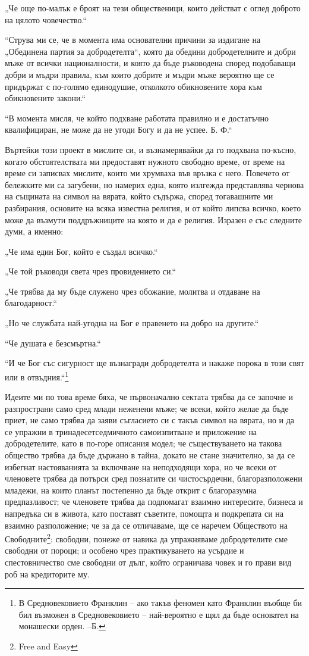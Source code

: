 \documentclass[12pt]{book}
\begin{document}
„Че още по-малък е броят на тези общественици, които действат с оглед доброто на цялото човечество.“

“Струва ми се, че в момента има основателни причини за издигане на „Обединена партия за добродетелта“, която да обедини добродетелните и добри мъже от всички националности, и която да бъде ръководена според подобаващи добри и мъдри правила, към които добрите и мъдри мъже вероятно ще се придържат с по-голямо единодушие, отколкото обикновените хора към обикновените закони.“

“В момента мисля, че който подхване работата правилно и е достатъчно квалифициран, не може да не угоди Богу и да не успее. 
Б. Ф.“

Въртейки този проект в мислите си, и възнамерявайки да го подхвана по-късно, когато обстоятелствата ми предоставят нужното свободно време, от време на време си записвах мислите, които ми хрумваха във връзка с него. Повечето от бележките ми са загубени, но намерих една, която излгежда представлява чернова на същината на символ на вярата, който съдържа, според тогавашните ми разбирания, основите на всяка известна религия, и от който липсва всичко, което може да възмути поддръжниците на която и да е религия. Изразен е със следните думи, а именно:

„Че има един Бог, който е създал всичко.“

„Че той ръководи света чрез провидението си.“

„Че трябва да му бъде служено чрез обожание, молитва и отдаване на благодарност.“

„Но че службата най-угодна на Бог е правенето на добро на другите.“

“Че душата е безсмъртна.“

“И че Бог със сигурност ще възнагради добродетелта и накаже порока в този свят или в отвъдния.“\footnote{В Средновековието Франклин – ако такъв феномен като Франклин въобще би бил възможен в Средновековието – най-вероятно е щял да бъде основател на монашески орден. --Б.}

Идеите ми по това време бяха, че първоначално сектата трябва да се започне и разпространи само сред млади неженени мъже; че всеки, който желае да бъде приет, не само трябва да заяви съгласието си с такъв символ на вярата, но и да се упражни в тринадесетседмичното самоизпитване и приложение на добродетелите, като в по-горе описания модел; че съществуването на такова общество трябва да бъде държано в тайна, докато не стане значително, за да се избегнат настояванията за включване на неподходящи хора, но че всеки от членовете трябва да потърси сред познатите си чистосърдечни, благоразположени младежи, на които планът постепенно да бъде открит с благоразумна предпазливост; че членовете трябва да подпомагат взаимно интересите, бизнеса и напредъка си в живота, като поставят съветите, помощта и подкрепата си на взаимно разположение; че за да се отличаваме, ще се наречем Обществото на Свободните\footnote{Free and Easy}: свободни, понеже от навика да упражняваме добродетелите сме свободни от пороци; и особено чрез практикуването на усърдие и спестовничество сме свободни от дълг, който ограничава човек и го прави вид роб на кредиторите му. 
\end{document}
